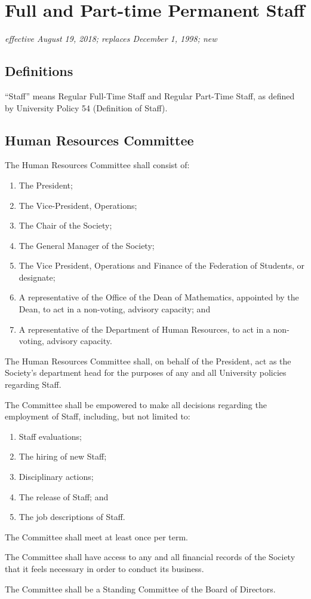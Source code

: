 \section{Full and Part-time Permanent Staff}
\emph{effective August 19, 2018; replaces December 1, 1998; new}\\

\subsection{Definitions}
“Staff” means Regular Full-Time Staff and Regular Part-Time Staff, as defined
by University Policy 54 (Definition of Staff).

\subsection{Human Resources Committee}
The Human Resources Committee shall consist of:
\begin{enumerate}
    \item The President;
    \item The Vice-President, Operations;
    \item The Chair of the Society;
    \item The General Manager of the Society;
    \item The Vice President, Operations and Finance of the Federation of 
        Students, or designate;
    \item A representative of the Office of the Dean of Mathematics, appointed
        by the Dean, to act in a non-voting, advisory capacity; and
    \item A representative of the Department of Human Resources, to act in a
        non-voting, advisory capacity.
\end{enumerate}

The Human Resources Committee shall, on behalf of the President, act as the
Society’s department head for the purposes of any and all University policies
regarding Staff.

The Committee shall be empowered to make all decisions regarding the employment
of Staff, including, but not limited to:
\begin{enumerate}
    \item Staff evaluations;
    \item The hiring of new Staff;
    \item Disciplinary actions;
    \item The release of Staff; and
    \item The job descriptions of Staff.
\end{enumerate}

The Committee shall meet at least once per term.

The Committee shall have access to any and all financial records of the Society
that it feels necessary in order to conduct its business.

The Committee shall be a Standing Committee of the Board of Directors.
